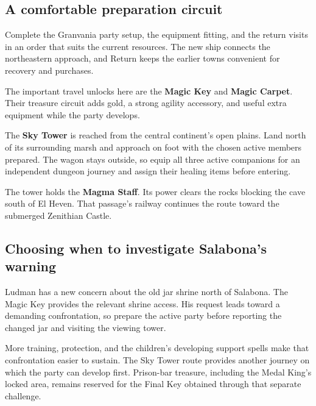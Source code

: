 \subsection*{A comfortable preparation circuit}

Complete the Granvania party setup, the equipment fitting, and
the return visits in an order that suits the current resources.
The new ship connects the northeastern approach, and Return keeps
the earlier towns convenient for recovery and purchases.

The important travel unlocks here are the \textbf{Magic Key} and
\textbf{Magic Carpet}. Their treasure circuit adds gold, a strong
agility accessory, and useful extra equipment while the party develops.

The \textbf{Sky Tower} is reached from the central continent's
open plains. Land north of its surrounding marsh and approach
on foot with the chosen active members prepared. The wagon stays
outside, so equip all three active companions for an independent
dungeon journey and assign their healing items before entering.

The tower holds the \textbf{Magma Staff}. Its power clears the
rocks blocking the cave south of El Heven. That passage's railway
continues the route toward the submerged Zenithian Castle.

\subsection*{Choosing when to investigate Salabona's warning}

Ludman has a new concern about the old jar shrine north of Salabona.
The Magic Key provides the relevant shrine access. His request leads
toward a demanding confrontation, so prepare the active party before
reporting the changed jar and visiting the viewing tower.

More training, protection, and the children's developing support
spells make that confrontation easier to sustain. The Sky Tower
route provides another journey on which the party can develop first.
Prison-bar treasure, including the Medal King's locked area, remains
reserved for the Final Key obtained through that separate challenge.

